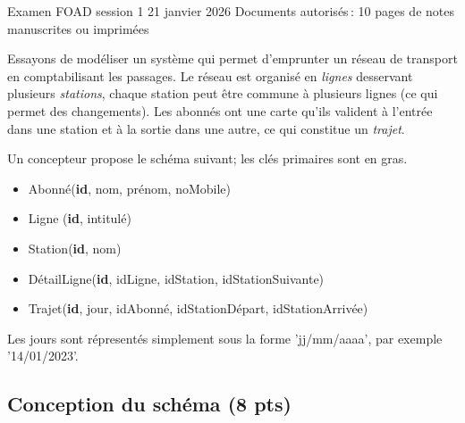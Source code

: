 %
{Examen FOAD session 1 21 janvier 2026}%
{Documents autorisés\,: 10 pages de notes manuscrites ou imprimées}%

Essayons de modéliser un système  qui permet d'emprunter 
un réseau de transport en comptabilisant les passages. Le réseau
est organisé en \emph{lignes} desservant plusieurs \emph{stations}, chaque station peut être commune
à plusieurs lignes (ce qui permet des changements). Les abonnés ont une carte
qu'ils valident à l'entrée dans une station et à la sortie dans une autre, ce qui
constitue un \emph{trajet}. 


Un concepteur propose le schéma suivant; les clés primaires sont en gras.

\begin{itemize}
\item Abonné(\textbf{id}, nom, prénom, noMobile)
\item Ligne (\textbf{id}, intitulé)
\item Station(\textbf{id}, nom)
\item DétailLigne(\textbf{id}, idLigne, idStation, idStationSuivante)
\item Trajet(\textbf{id}, jour, idAbonné, idStationDépart, idStationArrivée)
\end{itemize}


Les jours sont répresentés simplement sous la forme 'jj/mm/aaaa', par exemple '14/01/2023'.

\subsection*{Conception du schéma (8 pts)}

